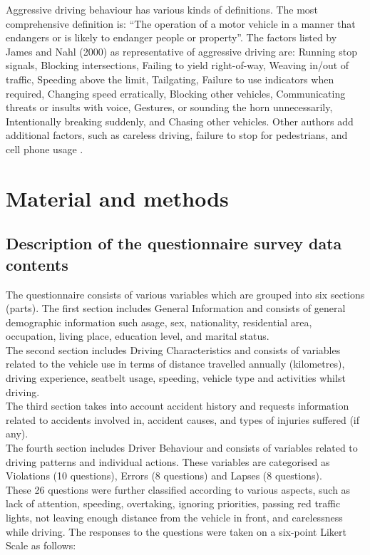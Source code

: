 \documentclass[preprint,12pt,a4paper,authoryear]{elsarticle}
\begin{document}
Aggressive driving behaviour has various kinds of definitions. The most comprehensive definition is: “The operation of a motor vehicle in a manner that endangers or is likely to endanger people or property”.  The factors listed by James and Nahl (2000) as representative of aggressive driving are: Running stop signals, Blocking intersections, Failing to yield right-of-way, Weaving in/out of traffic, Speeding above the limit, Tailgating, Failure to use indicators when required, Changing speed erratically, Blocking other vehicles, Communicating threats or insults with voice, Gestures, or sounding the horn unnecessarily, Intentionally breaking suddenly, and Chasing other vehicles. Other authors add additional factors, such as careless driving, failure to stop for pedestrians, and cell phone usage  \citep{James2000}.

\section{Material and methods}

\subsection{Description of the questionnaire survey data contents}
 The questionnaire consists of various variables which are grouped into six sections (parts). The first section includes General Information and consists of general demographic information such asage, sex, nationality, residential area, occupation, living place, education level, and marital status. \\
The second section includes Driving Characteristics and consists of variables related to the vehicle use in terms of distance travelled annually (kilometres), driving experience, seatbelt usage, speeding, vehicle type and activities  whilst driving. 
\\ 
The third section takes into account accident history and requests information related to accidents involved in, accident causes, and types of injuries suffered (if any).
\\
The fourth section includes Driver Behaviour and consists of variables related to driving patterns and individual actions. These variables are categorised as Violations (10 questions), Errors (8 questions) and Lapses (8 questions). 
\\
These 26 questions were further classified according to various aspects, such as lack of attention, speeding, overtaking, ignoring priorities, passing red traffic lights, not leaving enough distance from the vehicle in front, and carelessness while driving. The responses to the questions were taken on a six-point Likert Scale as follows: 
\end{document}
